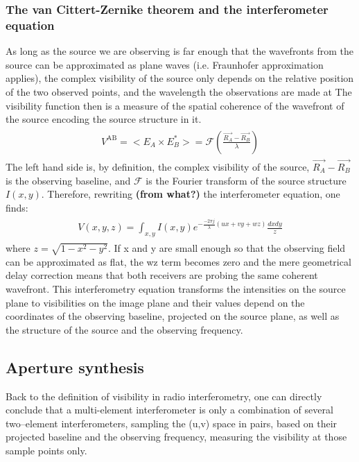 \documentclass[paper=a4, fontsize=11pt]{scrartcl} %
\numberwithin{equation}{section} %
\numberwithin{figure}{section} %
\numberwithin{table}{section} %
\begin{document}
\subsubsection*{The van Cittert-Zernike theorem and the interferometer equation}
As long as the source we are observing is far enough that the wavefronts from the source can be approximated as plane waves (i.e. Fraunhofer approximation applies), the complex visibility of the source only depends on the relative position of the two observed points, and the wavelength the observations are made at The visibility function then is a measure of the spatial coherence of the wavefront of the source encoding the source structure in it.
\begin{align} 
\begin{split}
\label{eq:vC-Z}
V^\mathrm{AB} = <E_A \times E_B^*> = \mathcal{F}(\frac{\vec{R_A} - \vec{R_B}}{\lambda})
\end{split}                    
\end{align}
The left hand side is, by definition, the complex visibility of the source, $\vec{R_A} - \vec{R_B}$ is the observing baseline, and $\mathcal{F}$ is the Fourier transform of the source structure $I(x,y)$. Therefore, rewriting {\bf (from what?)} the interferometer equation, one finds:
\begin{align} 
\begin{split}
\label{eq:InterferometerEq}
V(x,y,z) = \int_{x,y} I(x,y) e^{-\frac{-2\pi j}{\lambda}(ux+vy+wz)} \frac{dx dy}{z}
\end{split}                    
\end{align}
where $z=\sqrt{1-x^2-y^2}$. If x and y are small enough so that the observing field can be approximated as flat, the wz term becomes zero and the mere geometrical delay correction means that both receivers are probing the same coherent wavefront. This interferometry equation transforms the intensities on the source plane to visibilities on the image plane and their values depend on the coordinates of the observing baseline, projected on the source plane, as well as the structure of the source and the observing frequency. 


\subsection{Aperture synthesis}
Back to the definition of visibility in radio interferometry, one can directly conclude that a multi-element interferometer is only a combination of several two--element interferometers, sampling the (u,v) space in pairs, based on their projected baseline and the observing frequency, measuring the visibility at those sample points only. 
\end{document}
